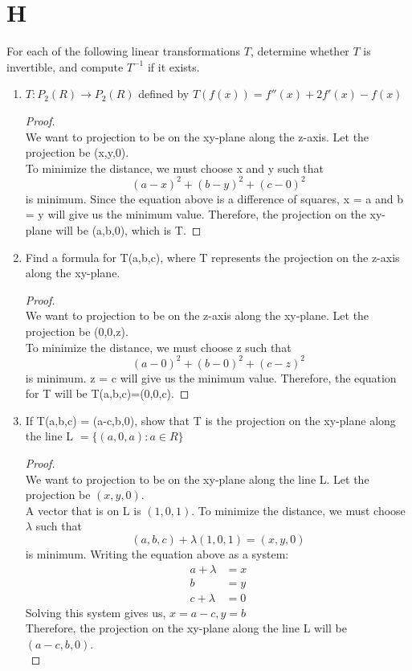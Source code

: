 \documentclass[11pt]{scrartcl}
\begin{document}
\section{H} 
For each of the following linear transformations $T$, determine whether $T$ is invertible, and compute $T^{-1}$ if it exists.
\begin{enumerate}[label=\alph*.]
	\item{
	$T : P_2(R) \rightarrow P_2(R)$ defined by $T(f(x)) = f''(x) + 2f'(x) - f(x)$
	\begin{proof}
	\-\\
	We want to projection to be on the xy-plane along the z-axis. Let the projection be (x,y,0).\\
	To minimize the distance, we must choose x and y such that
	$$(a - x)^2 + (b - y)^2 + (c - 0)^2$$
	is minimum.
	Since the equation above is a difference of squares, x = a and b = y will give us the minimum value.
	Therefore, the projection on the xy-plane will be (a,b,0), which is T.
	\end{proof}
	}
	
	\item{
	Find a formula for T(a,b,c), where T represents the projection on the z-axis along the xy-plane.
	\begin{proof}
	\-\\
	We want to projection to be on the z-axis along the xy-plane. Let the projection be (0,0,z).\\
	To minimize the distance, we must choose z such that
	$$(a - 0)^2 + (b - 0)^2 + (c - z)^2$$
	is minimum.
	z = c will give us the minimum value.
	Therefore, the equation for T will be T(a,b,c)=(0,0,c).
	\end{proof}
	}

	\item{
	If T(a,b,c) = (a-c,b,0), show that T is the projection on the xy-plane along the line L $= \{(a,0,a):a \in R\}$
	\begin{proof}
	\-\\
	We want to projection to be on the xy-plane along the line L. Let the projection be $(x,y,0)$.\\
	A vector that is on L is $(1,0,1)$.
	To minimize the distance, we must choose $\lambda$ such that
	$$(a,b,c) + \lambda (1,0,1) = (x,y,0)$$
	is minimum. Writing the equation above as a system:
	\[
	\begin{aligned}
		a + \lambda &= x\\
		b &= y\\
		c + \lambda &= 0
	\end{aligned}
	\]
	Solving this system gives us, $x = a - c, y = b$\\ 
	Therefore, the projection on the xy-plane along the line L will be $(a-c,b,0)$.\\
	\end{proof}
	}

\end{enumerate}
\end{document}
